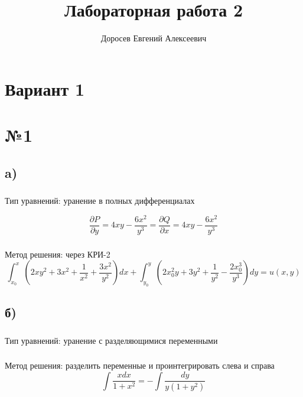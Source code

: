 \documentclass{article}
\title{Лабораторная работа 2}
\author{Доросев Евгений Алексеевич}
\date{}
\begin{document}
\maketitle
\section*{Вариант 1}
\section*{№1}
\subsection*{a)}
\subsubsection*{} 
Тип уравнений: уранение в полных дифференциалах

\begin{equation*}
\frac{\partial P}{\partial y}=4xy-\frac{6x^2}{y^3}=
\frac{\partial Q}{\partial x}=4xy-\frac{6x^2}{y^3}
\end{equation*}


\subsubsection*{}
Метод решения: через КРИ-2
\begin{equation*}
\int_{x_0}^{x}\left(2xy^2+3x^2+\frac{1}{x^2}+\frac{3x^2}{y^2}\right)dx+\int_{y_0}^{y}\left(2x_0^2y+3y^2+\frac{1}{y^2}-\frac{2x_0^3}{y^3}\right)dy=u(x,y)
\end{equation*}

\subsection*{б)}
\subsubsection*{} 
Тип уравнений: уранение с разделяющимися переменными
\subsubsection*{} 
Метод решения: разделить переменные и проинтегрировать слева и справа
\begin{equation*}
\int \frac{xdx}{1+x^2}=-\int \frac{dy}{y(1+y^2)}
\end{equation*}
\end{document}
